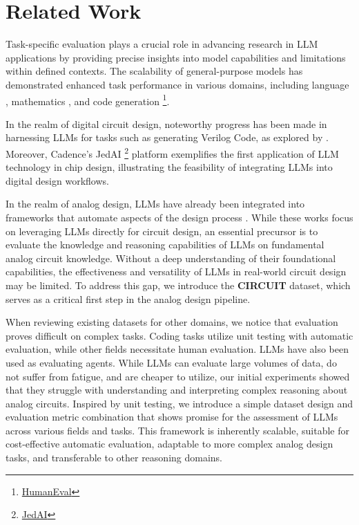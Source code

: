 \section{Related Work}
Task-specific evaluation plays a crucial role in advancing research in LLM applications by providing precise insights into model capabilities and limitations within defined contexts.
The scalability of general-purpose models has demonstrated enhanced task performance in various domains, including language \citep{brown2020languagemodelsfewshotlearners}, mathematics \citep{MathPaper2023, Mao2024CHAMP}, and code generation \citep{humanEvalpaper}\footnote{\href{https://paperswithcode.com/sota/code-generation-on-humaneval}{HumanEval}}. 

In the realm of digital circuit design, noteworthy progress has been made in harnessing LLMs for tasks such as generating Verilog Code, as explored by \citet{VerilogEval2023}. Moreover, Cadence's JedAI \footnote{\href{https://community.cadence.com/cadence_blogs_8/b/corporate/posts/cadence-creates-industry-s-first-llm-technology-for-chip-design}{JedAI}} platform exemplifies the first application of LLM technology in chip design, illustrating the feasibility of integrating LLMs into digital design workflows.

In the realm of analog design, LLMs have already been integrated into frameworks that automate aspects of the design process \citep{chang2024lamagic, lai2024analogcoder}. While these works focus on leveraging LLMs directly for circuit design, an essential precursor is to evaluate the knowledge and reasoning capabilities of LLMs on fundamental analog circuit knowledge. Without a deep understanding of their foundational capabilities, the effectiveness and versatility of LLMs in real-world circuit design may be limited. To address this gap, we introduce the \textbf{CIRCUIT} dataset, which serves as a critical first step in the analog design pipeline.

When reviewing existing datasets for other domains, we notice that evaluation proves difficult on complex tasks. Coding tasks utilize unit testing with automatic evaluation, while other fields necessitate human evaluation. LLMs have also been used as evaluating agents. \citep{Mao2024CHAMP, TruthfulQA} While LLMs can evaluate large volumes of data, do not suffer from fatigue, and are cheaper to utilize, our initial experiments showed that they struggle with understanding and interpreting complex reasoning about analog circuits.
Inspired by unit testing, we introduce a simple dataset design and evaluation metric combination that shows promise for the assessment of LLMs across various fields and tasks. This framework is inherently scalable, suitable for cost-effective automatic evaluation, adaptable to more complex analog design tasks, and transferable to other reasoning domains.


